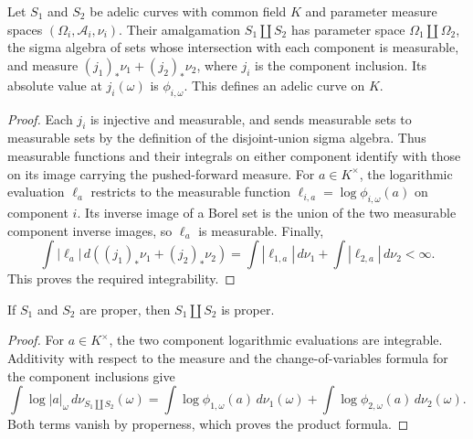 \begin{definition}
\label{def:adelic-amalgamation}
\leanok
{}
Let $S_1$ and $S_2$ be adelic curves with common field $K$ and
parameter measure spaces $(\Omega_i,\mathcal A_i,\nu_i)$.
Their amalgamation $S_1\amalg S_2$ has parameter space
$\Omega_1\amalg\Omega_2$, the sigma algebra of sets whose
intersection with each component is measurable, and measure
$(j_1)_*\nu_1+(j_2)_*\nu_2$, where $j_i$ is the component inclusion.
Its absolute value at $j_i(\omega)$ is $\phi_{i,\omega}$.
This defines an adelic curve on $K$.
\end{definition}
\begin{proof}
Each $j_i$ is injective and measurable, and sends measurable sets to
measurable sets by the definition of the disjoint-union sigma algebra.
Thus measurable functions and their integrals on either component
identify with those on its image carrying the pushed-forward measure.
For $a\in K^\times$, the logarithmic evaluation $\ell_a$ restricts
to the measurable function $\ell_{i,a}=\log\phi_{i,\omega}(a)$ on
component $i$. Its inverse image of a Borel set is the union of the
two measurable component inverse images, so $\ell_a$ is measurable.
Finally,
\[
 \int|\ell_a|\,d((j_1)_*\nu_1+(j_2)_*\nu_2)
 =\int|\ell_{1,a}|\,d\nu_1+\int|\ell_{2,a}|\,d\nu_2<\infty.
\]
This proves the required integrability.
\end{proof}

\begin{proposition}
\label{prop:proper-amalgamation}
\leanok
{}
If $S_1$ and $S_2$ are proper, then $S_1\amalg S_2$ is proper.
\end{proposition}
\begin{proof}
For $a\in K^\times$, the two component logarithmic evaluations
are integrable. Additivity with respect to the measure and the
change-of-variables formula for the component inclusions give
\[
 \int\log|a|_\omega\,d\nu_{S_1\amalg S_2}(\omega)
 =\int\log\phi_{1,\omega}(a)\,d\nu_1(\omega)
  +\int\log\phi_{2,\omega}(a)\,d\nu_2(\omega).
\]
Both terms vanish by properness, which proves the product formula.
\end{proof}

